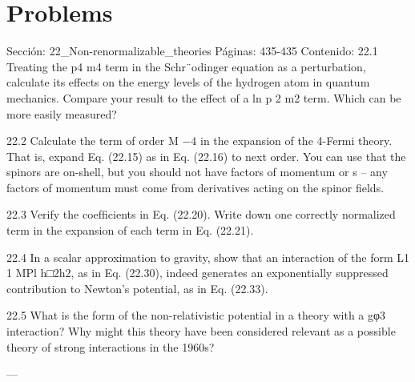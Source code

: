 \section*{Problems}
Sección: 22_Non-renormalizable_theories
Páginas: 435-435
Contenido:
22.1 Treating the
p4
m4 term in the Schr¨odinger equation as a perturbation, calculate its
effects on the energy levels of the hydrogen atom in quantum mechanics. Compare
your result to the effect of a ln ⃗p 2
m2 term. Which can be more easily measured?

22.2 Calculate the term of order M −4 in the expansion of the 4-Fermi theory. That is,
expand Eq. (22.15) as in Eq. (22.16) to next order. You can use that the spinors
are on-shell, but you should not have factors of momentum or s – any factors of
momentum must come from derivatives acting on the spinor ﬁelds.

22.3 Verify the coefﬁcients in Eq. (22.20). Write down one correctly normalized term in
the expansion of each term in Eq. (22.21).

22.4 In a scalar approximation to gravity, show that an interaction of the form
L1
1
MPl h□2h2, as in Eq. (22.30), indeed generates an exponentially suppressed
contribution to Newton’s potential, as in Eq. (22.33).

22.5 What is the form of the non-relativistic potential in a theory with a gφ3 interaction?
Why might this theory have been considered relevant as a possible theory of strong
interactions in the 1960s?


---

